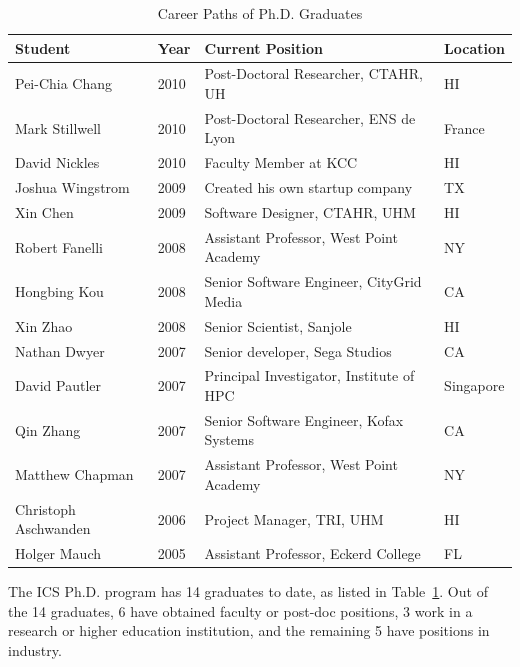 \documentclass[12pt]{article}
\begin{document}
\begin{table}[Htb]
\caption{Career Paths of Ph.D. Graduates}
\label{tab.phd}
\begin{tabular}{|l|l|l|l|}
\hline
Student & Year & Current Position & Location \\
\hline
Pei-Chia Chang & 2010 & Post-Doctoral Researcher, CTAHR, UH & HI \\
Mark Stillwell & 2010 & Post-Doctoral Researcher, ENS de Lyon & France \\
David Nickles & 2010 & Faculty Member at KCC & HI \\
Joshua Wingstrom & 2009 & Created his own startup company & TX\\
Xin Chen & 2009 & Software Designer, CTAHR, UHM & HI\\
Robert Fanelli & 2008 & Assistant Professor, West Point Academy & NY\\
Hongbing Kou & 2008 & Senior Software Engineer, CityGrid Media &  CA\\
Xin Zhao & 2008 & Senior Scientist, Sanjole & HI\\
Nathan Dwyer & 2007 & Senior developer, Sega Studios & CA\\
David Pautler & 2007 & Principal Investigator, Institute of HPC & Singapore\\
Qin Zhang & 2007 & Senior Software Engineer, Kofax Systems & CA\\
Matthew Chapman & 2007 & Assistant Professor, West Point Academy & NY\\
Christoph Aschwanden & 2006 & Project Manager, TRI, UHM & HI\\
Holger Mauch & 2005 & Assistant Professor, Eckerd College & FL\\
\hline
\end{tabular}
\end{table}

The ICS Ph.D. program has 14 graduates to date, as
listed in Table~\ref{tab.phd}.  Out of the 14 graduates, 6 have
obtained faculty or post-doc positions, 3 work in a research or higher education
institution, and the remaining 5 have positions in industry.
\end{document}
